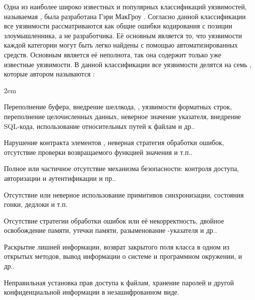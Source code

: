 %
Одна из наиболее широко известных и популярных классификаций уязвимостей, называемая , была разработана Гэри МакГроу   . 
%
Согласно данной классификации все уязвимости рассматриваются как общие ошибки кодирования с позиции злоумышленника, а не разработчика. 
%
Её основным  является то, что уязвимости каждой категории могут быть легко найдены с помощью автоматизированных средств. 
%
Основным  является её неполнота, так она содержит только уже известные уязвимости. 
%
В данной классификации все уязвимости делятся на семь , которые автором называются :  
\begin{description}
	\leftskip2em%
	\setlength{\itemsep}{0pt}%
	\setlength{\parsep}{0pt}%

	\item[Проверка входных данных и их представление.] Переполнение буфера, внедрение шеллкода, , уязвимости форматных строк, переполнение целочисленных данных, неверное значение указателя, внедрение SQL-кода, использование относительных путей к файлам и др..
	
	\item[Неправильное использование API.] Нарушение контракта элементов , неверная стратегия обработки ошибок, отсутствие проверки возвращаемого функцией значения и т.п..

	\item[Средства безопасности.] Полное или частичное отсутствие механизма безопасности: контроля доступа, авторизации и аутентификации и пр..

	\item[Время и состояние.] Отсутствие или неверное использование примитивов синхронизации, состояния гонки, дедлоки и т.п.
	
	\item[Ошибки.] Отсутствие стратегии обработки ошибок или её некорректность, двойное освобождение памяти, утечки памяти, разыменование -указателя и др..
	
	\item[Инкапсуляция.] Раскрытие лишней информации, возврат закрытого поля класса в одном из открытых методов, вывод информации о системе и программном окружении, и др..
	
	\item[Программное окружение.] Неправильная установка прав доступа к файлам, хранение паролей и другой конфиденциальной информации в незашифрованном виде.
\end{description}

